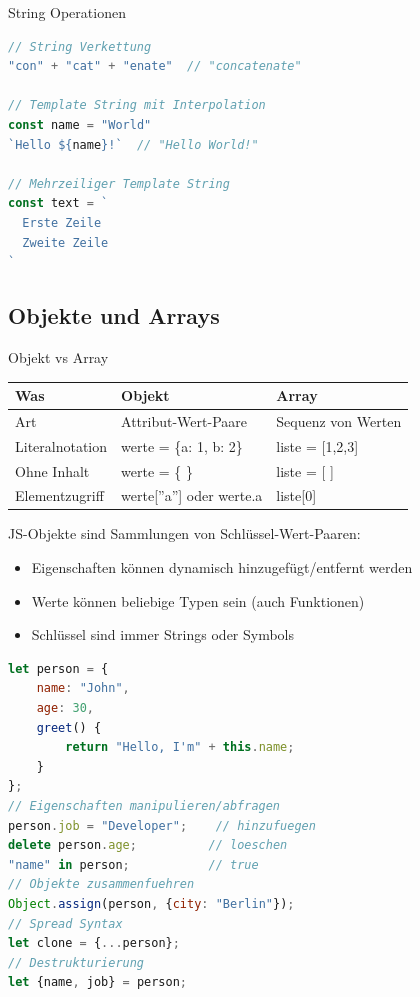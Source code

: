 \begin{KR}{String Operationen}
\begin{lstlisting}[language=JavaScript, style=basesmol]
// String Verkettung
"con" + "cat" + "enate"  // "concatenate"

// Template String mit Interpolation
const name = "World"
`Hello ${name}!`  // "Hello World!"

// Mehrzeiliger Template String
const text = `
  Erste Zeile
  Zweite Zeile
`
\end{lstlisting}
\end{KR}

\raggedcolumns

\columnbreak


\subsection{Objekte und Arrays}

\begin{theorem}{Objekt vs Array}\\
    \begin{tabular}{|l|l|l|}
        \hline
        Was & Objekt & Array \\
        \hline
        Art & Attribut-Wert-Paare & Sequenz von Werten \\
        \hline
        Literalnotation & werte = \{a: 1, b: 2\} & liste = [1,2,3] \\
        \hline
        Ohne Inhalt & werte = \{ \} & liste = [ ] \\
        \hline
        Elementzugriff & werte[''a''] oder werte.a & liste[0] \\
        \hline
    \end{tabular}
\end{theorem}

\begin{definition}{JS-Objekte}
    sind Sammlungen von Schlüssel-Wert-Paaren:
    \begin{itemize}
        \item Eigenschaften können dynamisch hinzugefügt/entfernt werden
        \item Werte können beliebige Typen sein (auch Funktionen)
        \item Schlüssel sind immer Strings oder Symbols
    \end{itemize}

\begin{lstlisting}[language=JavaScript, style=basesmol]
let person = {
    name: "John",
    age: 30,
    greet() {
        return "Hello, I'm" + this.name;
    }
};
// Eigenschaften manipulieren/abfragen
person.job = "Developer";    // hinzufuegen
delete person.age;          // loeschen
"name" in person;           // true
// Objekte zusammenfuehren
Object.assign(person, {city: "Berlin"});
// Spread Syntax
let clone = {...person};
// Destrukturierung
let {name, job} = person;
\end{lstlisting}
\end{definition}

